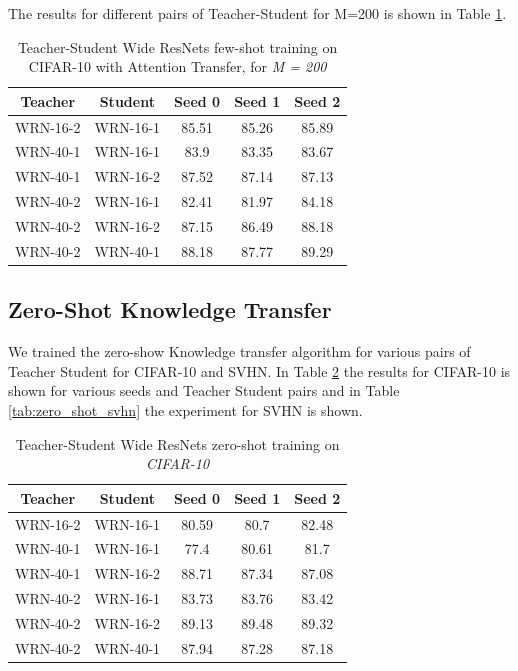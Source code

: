 \newpage
The results for different pairs of Teacher-Student for M=200 is shown in Table \ref{tab:few_cifar_m_200}. 

\begin{table}[!h]
    \centering
    \begin{tabular}{cc|ccc}
    \toprule
    \toprule
         \textbf{Teacher} & \textbf{Student} & \textbf{Seed 0} & \textbf{Seed 1} & \textbf{Seed 2} \\
         \midrule
         WRN-16-2 & WRN-16-1 & 85.51 & 85.26 & 85.89 \\
         WRN-40-1 & WRN-16-1 & 83.9 & 83.35 & 83.67 \\
         WRN-40-1 & WRN-16-2 & 87.52 & 87.14 & 87.13 \\
         WRN-40-2 & WRN-16-1 & 82.41 & 81.97 & 84.18 \\
         WRN-40-2 & WRN-16-2 & 87.15 & 86.49 & 88.18\\
         WRN-40-2 & WRN-40-1 & 88.18 & 87.77 & 89.29 \\
         \bottomrule
         \bottomrule
    \end{tabular}
    \vspace{0.25cm}
    \caption{Teacher-Student Wide ResNets few-shot training on CIFAR-10 with Attention Transfer, for \textit{M = 200}}
    \label{tab:few_cifar_m_200}
\end{table}

\subsection{Zero-Shot Knowledge Transfer}

We trained the zero-show Knowledge transfer algorithm for various pairs of Teacher Student for CIFAR-10 and SVHN. In Table \ref{tab:zero_shot_cifar_10} the results for CIFAR-10 is shown for various seeds and Teacher Student pairs and in Table \ref{tab:zero_shot_svhn} the experiment for SVHN is shown.

\begin{table}[!h]
    \centering
    \begin{tabular}{cc|ccc}
    \toprule
    \toprule
         \textbf{Teacher} & \textbf{Student} & \textbf{Seed 0} & \textbf{Seed 1} & \textbf{Seed 2} \\
         \midrule
         WRN-16-2 & WRN-16-1 & 80.59 & 80.7 & 82.48 \\
         WRN-40-1 & WRN-16-1 & 77.4 & 80.61 & 81.7 \\
         WRN-40-1 & WRN-16-2 & 88.71 & 87.34 & 87.08 \\
         WRN-40-2 & WRN-16-1 & 83.73 & 83.76 & 83.42 \\
         WRN-40-2 & WRN-16-2 & 89.13 & 89.48 & 89.32\\ 
         WRN-40-2 & WRN-40-1 & 87.94 & 87.28 & 87.18  \\
         \bottomrule
         \bottomrule
    \end{tabular}
    \vspace{0.25cm}
    \caption{Teacher-Student Wide ResNets zero-shot training on \textit{CIFAR-10}}
    \label{tab:zero_shot_cifar_10}

\end{table}


